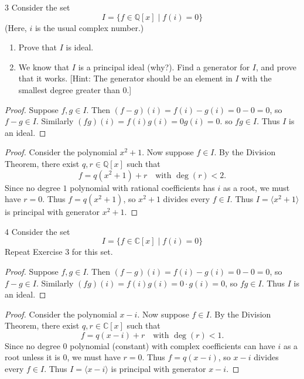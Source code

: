 \begin{problem}{3}
    Consider the set 
    \[I = \{f \in \mathbb{Q}[x] \mid f(i) = 0\}\]
    (Here, $i$ is the usual complex number.)
    \begin{enumerate}
        \item Prove that $I$ is ideal.
        \item We know that $I$ is a principal ideal (why?). 
              Find a generator for $I$, and prove that it works.
              [Hint: The generator should be an element in $I$ with the smallest degree greater than $0$.]
    \end{enumerate}
\end{problem}
\solved

\begin{proof}
    Suppose $f, g \in I$.  
    Then $(f - g)(i) = f(i) - g(i) = 0 - 0 = 0$, so $f - g \in I$.  
    Similarly $(fg)(i) = f(i)g(i) = 0 g(i) = 0$. so $fg \in I$.
    Thus $I$ is an ideal.
\end{proof}

\begin{proof}
    Consider the polynomial $x^2 + 1$.  
    Now suppose $f \in I$. By the Division Theorem, there exist $q, r \in \mathbb{Q}[x]$ such that  
    \[
    f = q(x^2 + 1) + r \quad \text{with } \deg(r) < 2.
    \]  
    Since no degree $1$ polynomial with rational coefficients has $i$ as a root, we must have $r = 0$.  
    Thus $f = q(x^2 + 1)$, so $x^2 + 1$ divides every $f \in I$.  
    Thus $I = \langle x^2 + 1 \rangle$ is principal with generator $x^2 + 1$.
\end{proof}

\begin{problem}{4}
    Consider the set 
    \[I = \{f \in \mathbb{C}[x] \mid f(i) = 0\}\]
    Repeat Exercise 3 for this set.
\end{problem}
\solved

\begin{proof}
    Suppose $f, g \in I$.  
    Then $(f - g)(i) = f(i) - g(i) = 0 - 0 = 0$, so $f - g \in I$.  
    Similarly $(fg)(i) = f(i)g(i) = 0 \cdot g(i) = 0$, so $fg \in I$.  
    Thus $I$ is an ideal.
\end{proof}

\begin{proof}
    Consider the polynomial $x - i$.  
    Now suppose $f \in I$. By the Division Theorem, there exist $q, r \in \mathbb{C}[x]$ such that  
    \[
    f = q(x - i) + r \quad \text{with } \deg(r) < 1.
    \]  
    Since no degree $0$ polynomial (constant) with complex coefficients can have $i$ as a root unless it is $0$, we must have $r = 0$.  
    Thus $f = q(x - i)$, so $x - i$ divides every $f \in I$.  
    Thus $I = \langle x - i \rangle$ is principal with generator $x - i$.
\end{proof}


